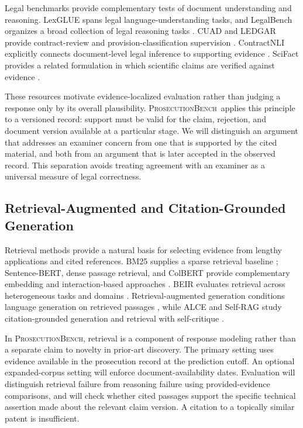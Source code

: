 \documentclass[11pt]{article}
\newcommand{\bench}{\textsc{ProsecutionBench}}
\begin{document}
Legal benchmarks provide complementary tests of document understanding and reasoning. LexGLUE spans legal language-understanding tasks, and LegalBench organizes a broad collection of legal reasoning tasks \citep{chalkidis2022lexglue,guha2023legalbench}. CUAD and LEDGAR provide contract-review and provision-classification supervision \citep{hendrycks2021cuad,tuggener2020ledgar}. ContractNLI explicitly connects document-level legal inference to supporting evidence \citep{koreeda2021contractnli}. SciFact provides a related formulation in which scientific claims are verified against evidence \citep{wadden2020scifact}.

These resources motivate evidence-localized evaluation rather than judging a response only by its overall plausibility. \bench\ applies this principle to a versioned record: support must be valid for the claim, rejection, and document version available at a particular stage. We will distinguish an argument that addresses an examiner concern from one that is supported by the cited material, and both from an argument that is later accepted in the observed record. This separation avoids treating agreement with an examiner as a universal measure of legal correctness.

\subsection{Retrieval-Augmented and Citation-Grounded Generation}
\label{sec:rw-retrieval-grounding}

Retrieval methods provide a natural basis for selecting evidence from lengthy applications and cited references. BM25 supplies a sparse retrieval baseline \citep{robertson2009bm25}; Sentence-BERT, dense passage retrieval, and ColBERT provide complementary embedding and interaction-based approaches \citep{reimers2019sbert,karpukhin2020dpr,khattab2020colbert}. BEIR evaluates retrieval across heterogeneous tasks and domains \citep{thakur2021beir}. Retrieval-augmented generation conditions language generation on retrieved passages \citep{lewis2020rag}, while ALCE and Self-RAG study citation-grounded generation and retrieval with self-critique \citep{gao2023alce,asai2023selfrag}.

In \bench, retrieval is a component of response modeling rather than a separate claim to novelty in prior-art discovery. The primary setting uses evidence available in the prosecution record at the prediction cutoff. An optional expanded-corpus setting will enforce document-availability dates. Evaluation will distinguish retrieval failure from reasoning failure using provided-evidence comparisons, and will check whether cited passages support the specific technical assertion made about the relevant claim version. A citation to a topically similar patent is insufficient.
\end{document}
